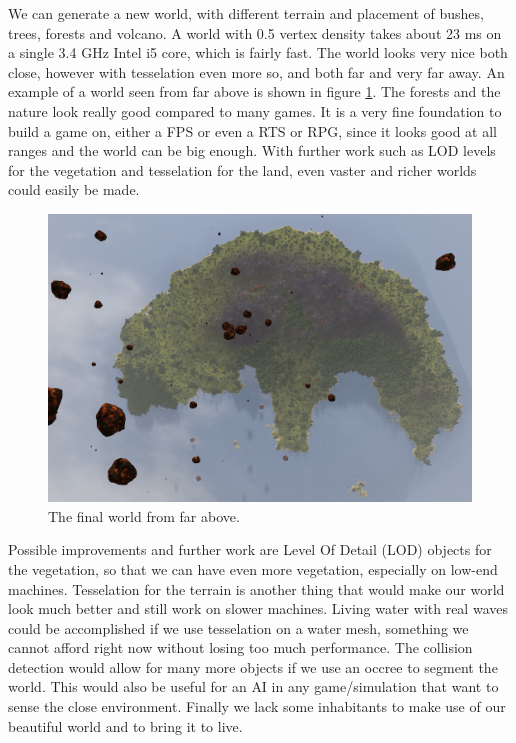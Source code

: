 We can generate a new world, with different terrain and placement of bushes, trees, forests and volcano. A world with 0.5 vertex density takes about 23 ms on a single 3.4 GHz Intel i5 core, which is fairly fast. The world looks very nice both close, however with tesselation even more so, and both far and very far away. An example of a world seen from far above is shown in figure \ref{fig:worldFromFarAbove}. The forests and the nature look really good compared to many games. It is a very fine foundation to build a game on, either a FPS or even a RTS or RPG, since it looks good at all ranges and the world can be big enough. With further work such as LOD levels for the vegetation and tesselation for the land, even vaster and richer worlds could easily be made.
\begin{figure}[H]
  \centering
  \includegraphics[width=\linewidth]{images/worldFromAFarTop.jpg}
  \caption{The final world from far above.}
  \label{fig:worldFromFarAbove}
\end{figure}%

Possible improvements and further work are Level Of Detail (LOD) objects for the vegetation, so that we can have even more vegetation, especially on low-end machines. Tesselation for the terrain is another thing that would make our world look much better and still work on slower machines. Living water with real waves could be accomplished if we use tesselation on a water mesh, something we cannot afford right now without losing too much performance. The collision detection would allow for many more objects if we use an occree to segment the world. This would also be useful for an AI in any game/simulation that want to sense the close environment. Finally we lack some inhabitants to make use of our beautiful world and to bring it to live.
















